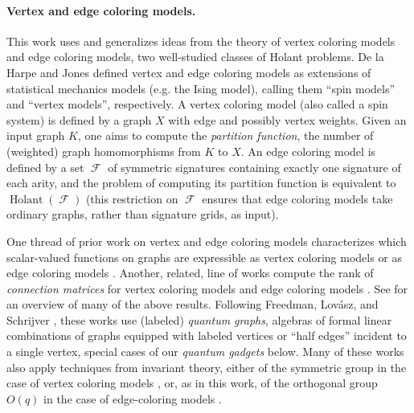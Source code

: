\documentclass{theoretics}
\DeclareMathOperator{\fc}{\mathcal{F}}
\DeclareMathOperator{\holant}{Holant}
\DeclareMathOperator{\eq}{\mathcal{EQ}}
\DeclareMathOperator{\geneq}{\mathcal{GEQ}}
\begin{document}
\paragraph{Vertex and edge coloring models.}
This work uses and generalizes ideas from the theory of vertex coloring models and edge coloring models,
two well-studied classes of Holant problems.
De la Harpe and Jones \cite{jones} defined vertex and edge coloring models as extensions of 
statistical mechanics models (e.g. the Ising model), calling them ``spin models'' and ``vertex models'',
respectively. A vertex coloring model (also called a spin system) is defined by a graph $X$ with edge and possibly vertex
weights. Given an input graph $K$, one aims to compute the \emph{partition function}, the number of 
(weighted) graph homomorphisms from $K$ to $X$.
An edge coloring model is defined by a set $\fc$ of symmetric signatures containing exactly
one signature of each arity, and the problem of computing its partition function is equivalent to 
$\holant(\fc)$ (this restriction on $\fc$ ensures that
edge coloring models take ordinary graphs, rather than signature grids, as input).

One thread of prior work on vertex and edge coloring models 
characterizes which scalar-valued functions on graphs
are expressible as vertex coloring models \cite{freedman_reflection, schrijver}
or as edge coloring models 
\cite{szegedy_edge_2007, schrijver_graph_2008, draisma_characterizing_2012, regts_characterization_2013}.
Another, related, line of works compute the rank of \emph{connection matrices}
for vertex coloring models \cite{lovasz} and edge coloring models 
\cite{regts_rank_2012,draisma_tensor_2013}.
See \cite{regts} for an overview of many of the above results. 
Following Freedman, Lov\'{a}sz, and Schrijver \cite{freedman_reflection}, these works use
(labeled) \emph{quantum graphs}, algebras of formal linear combinations of graphs 
equipped with labeled vertices or ``half edges'' incident to a single vertex,
special cases of our \emph{quantum gadgets} below.
Many of these works also apply techniques from invariant theory, either of the symmetric group
in the case of vertex coloring models \cite{schrijver}, or, as in this work, of the
orthogonal group $O(q)$ in the case of edge-coloring models \cite{szegedy_edge_2007, schrijver_graph_2008, draisma_characterizing_2012, regts_rank_2012, draisma_tensor_2013, regts_characterization_2013}.
\end{document}
